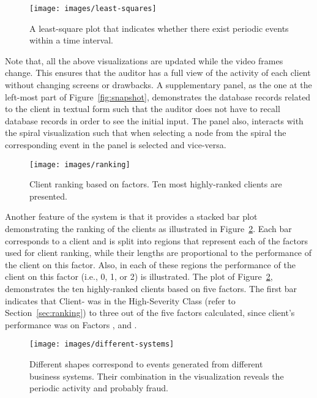 \documentclass[conference]{IEEEtran}
\begin{document}
\begin{figure}[h!tb]
  \texttt{[image: images/least-squares]}
  \caption{A least-square plot that indicates whether there exist periodic events within a time interval.}
  \label{fig:least-squares}
\end{figure}

Note that, all the above visualizations are updated while the video
frames change. This ensures that the auditor has a full view of the
activity of each client without changing screens or drawbacks. A
supplementary panel, as the one at the left-most part of
Figure~\ref{fig:snapshot}, demonstrates the database records related
to the client in textual form such that the auditor does not have to
recall database records in order to see the initial input. The panel
also, interacts with the spiral visualization such that when
selecting a node from the spiral the corresponding event in the
panel is selected and vice-versa.

\begin{figure}[h!tb]
    \centering
  \texttt{[image: images/ranking]}
  \caption{Client ranking based on  factors. Ten most highly-ranked clients are presented.}
  \label{fig:ranking}
\end{figure}

Another feature of the system is that it provides a stacked bar plot
demonstrating the ranking of the clients as illustrated in
Figure~\ref{fig:ranking}. Each bar corresponds to a client and is
split into regions that represent each of the factors used for
client ranking, while their lengths are proportional to the
performance of the client on this factor. Also, in each of these
regions the performance of the client on this factor (i.e., 0, 1, or
2) is illustrated. The plot of Figure~\ref{fig:ranking},
demonstrates the ten highly-ranked clients based on five factors.
The first bar indicates that Client- was in the High-Severity
Class (refer to Section~\ref{sec:ranking}) to three out of the five
factors calculated, since client's performance was  on Factors
,  and .

\begin{figure}[h!tb]
  \centering
  \texttt{[image: images/different-systems]}
  \caption{Different shapes correspond to events generated from different business systems.
   Their combination in the visualization reveals the periodic activity and probably fraud.}
  \label{fig:different-systems}
\end{figure}
\end{document}
